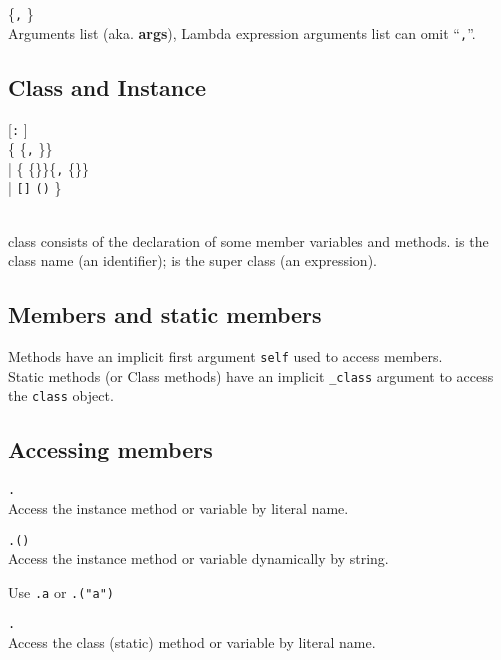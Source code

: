 \hangpar {} \{\texttt{,} \}\\
Arguments list (aka. \textbf{args}), Lambda expression arguments list can omit ``\texttt{,}''.

\subsection*{Class and Instance}
\hangpar {}  [\texttt{:} ]\\
\{ \{\texttt{,} \}\}\\
    | \{ \{\texttb{=}\}\}\{\texttt{,} \{\texttb{=}\}\}\\
    | \hangpar \texttt{[}\texttt{]}   \texttt{(}\texttt{)}  \}

\hangpar {} \\
class consists of the declaration of some member variables and methods.  is the class name (an identifier);  is the super class (an expression).

\subsection*{Members and static members}

Methods have an implicit first argument \texttt{self} used to access members.\\
Static methods (or Class methods) have an implicit \texttt{\_class} argument to access the \texttt{class} object.

\subsection*{Accessing members}

\hangpar {}\texttt{.}\\
Access the instance method or variable by literal name.

\hangpar {}\texttt{.(}\texttt{)}\\
Access the instance method or variable dynamically by string.

Use \texttt{.a} or \texttt{.("a")}

\hangpar {}\texttt{.}\\
Access the class (static) method or variable by literal name.

